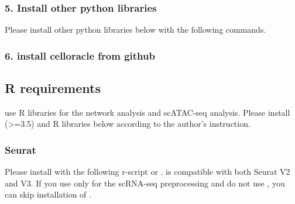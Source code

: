 \documentclass[letterpaper,10pt,english]{sphinxmanual}
\begin{document}
\begin{sphinxVerbatim}[commandchars=\\\{\}]
   
\end{sphinxVerbatim}


\subsubsection{5. Install other python libraries}
\label{\detokenize{installation/index:install-other-python-libraries}}
Please install other python libraries below with the following commands.

\begin{sphinxVerbatim}[commandchars=\\\{\}]
      
\end{sphinxVerbatim}


\subsubsection{6. install celloracle from github}
\label{\detokenize{installation/index:install-celloracle-from-github}}
\begin{sphinxVerbatim}[commandchars=\\\{\}]
  
\end{sphinxVerbatim}


\subsection{R requirements}
\label{\detokenize{installation/index:r-requirements}}
 use R libraries for the network analysis and scATAC-seq analysis.
Please install  (\textgreater{}=3.5) and R libraries below according to the author’s instruction.


\subsubsection{Seurat}
\label{\detokenize{installation/index:id3}}
Please install  with the following r-script or  .
 is compatible with both Seurat V2 and V3.
If you use only  for the scRNA-seq preprocessing and do not use  , you can skip installation of .
\end{document}
